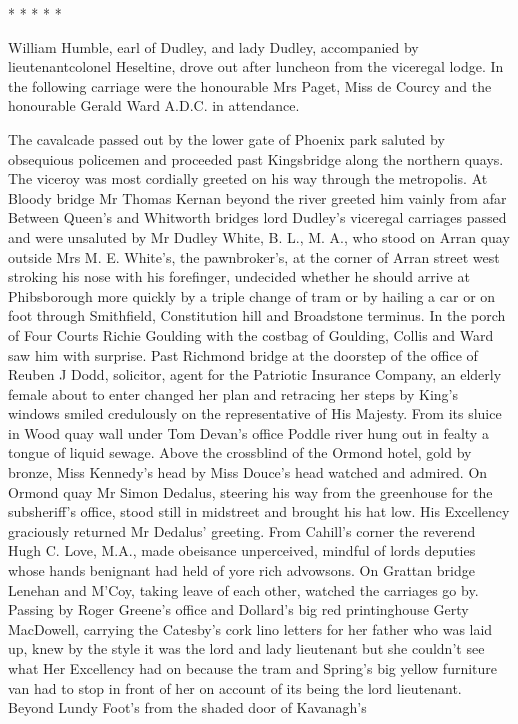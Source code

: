     * * * * *


William Humble, earl of Dudley, and lady Dudley, accompanied by
lieutenantcolonel Heseltine, drove out after luncheon from the viceregal
lodge. In the following carriage were the honourable Mrs Paget, Miss de
Courcy and the honourable Gerald Ward A.D.C. in attendance.

The cavalcade passed out by the lower gate of Phoenix park saluted
by obsequious policemen and proceeded past Kingsbridge along the
northern quays. The viceroy was most cordially greeted on his way through
the metropolis. At Bloody bridge Mr Thomas Kernan beyond the river
greeted him vainly from afar Between Queen's and Whitworth bridges lord
Dudley's viceregal carriages passed and were unsaluted by Mr Dudley
White, B. L., M. A., who stood on Arran quay outside Mrs M. E. White's,
the pawnbroker's, at the corner of Arran street west stroking his nose
with his forefinger, undecided whether he should arrive at Phibsborough
more quickly by a triple change of tram or by hailing a car or on foot
through Smithfield, Constitution hill and Broadstone terminus. In the
porch of Four Courts Richie Goulding with the costbag of Goulding,
Collis and Ward saw him with surprise. Past Richmond bridge at the
doorstep of the office of Reuben J Dodd, solicitor, agent for the
Patriotic Insurance Company, an elderly female about to enter changed
her plan and retracing her steps by King's windows smiled credulously
on the representative of His Majesty. From its sluice in Wood quay
wall under Tom Devan's office Poddle river hung out in fealty a tongue
of liquid sewage. Above the crossblind of the Ormond hotel, gold by
bronze, Miss Kennedy's head by Miss Douce's head watched and admired.
On Ormond quay Mr Simon Dedalus, steering his way from the greenhouse
for the subsheriff's office, stood still in midstreet and brought his
hat low. His Excellency graciously returned Mr Dedalus' greeting. From
Cahill's corner the reverend Hugh C. Love, M.A., made obeisance
unperceived, mindful of lords deputies whose hands benignant
had held of yore rich advowsons. On Grattan bridge Lenehan and M'Coy,
taking leave of each other, watched the carriages go by. Passing by Roger
Greene's office and Dollard's big red printinghouse Gerty MacDowell,
carrying the Catesby's cork lino letters for her father who was laid up,
knew by the style it was the lord and lady lieutenant but she couldn't see
what Her Excellency had on because the tram and Spring's big yellow
furniture van had to stop in front of her on account of its being the lord
lieutenant. Beyond Lundy Foot's from the shaded door of Kavanagh's
